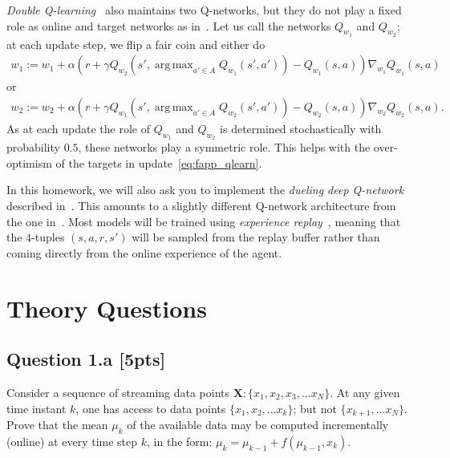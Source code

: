 \documentclass[12pt]{article}
\DeclareMathOperator*{\argmax}{arg\,max}
\begin{document}
\emph{Double Q-learning}~\cite{van2016deep} also maintains two Q-networks, but they do not play a fixed role as online and target networks as in~\cite{mnih2013playing, mnih2015human}. Let us call the networks $Q _{w _1}$ and $Q _{w _2}$; at each update step, we flip a fair coin and either do 
\begin{align}
	{w _1} := {w _1} + 
		\alpha \left( 
			r + \gamma Q _{w _2}
				(
					s', \argmax _{a' \in A} Q _{w _1} (s', a')
				) 
				- Q _{w _1}(s, a) 
		\right) \nabla _{w _1} 
			Q _{w _1} (s, a) 
\end{align}
or 
\begin{align*}
	{w _2} := {w _2} + 
		\alpha \left( 
			r + \gamma Q _{w _1}
				(
					s', \argmax _{a' \in A} Q _{w _2} (s', a')
				) 
				- Q _{w _2}(s, a) 
		\right) \nabla _{w _2} 
			Q _{w _2} (s, a) .	
\end{align*}
As at each update the role of $Q _{w _1}$ and $Q _{w _2}$ is determined stochastically with probability $0.5$, these networks play a symmetric role. This helps with the over-optimism of the targets in update~\eqref{eq:fapp_qlearn}.
\fi

In this homework, we will also ask you to implement the \emph{dueling deep Q-network} described in~\cite{wang2015dueling}. This amounts to a slightly different Q-network architecture from the 
one in~\cite{mnih2013playing, mnih2015human}. Most models will be trained using \emph{experience replay}~\cite{mnih2013playing, mnih2015human}, meaning that the $4$-tuples $(s, a, r, s')$ will be sampled from the replay buffer rather than coming directly from the online experience of the agent.

\section{Theory Questions}
\subsection*{Question 1.a \textbf{[5pts]}}

Consider a sequence of streaming data points $\mathbf{X}: \{ x_1, x_2, x_3, ... x_N\}$. At any given time instant $k$, one has access to data points $\{ x_1, x_2, ... x_k\}$; but not $\{ x_{k+1}, ... x_N\}$. 
Prove that the mean $\mu_k$ of the available data may be computed incrementally (online) at every time step $k$, in the form: $\mu_k =\mu_{k-1} + f(\mu_{k-1}, x_k)$.\\
\end{document}
